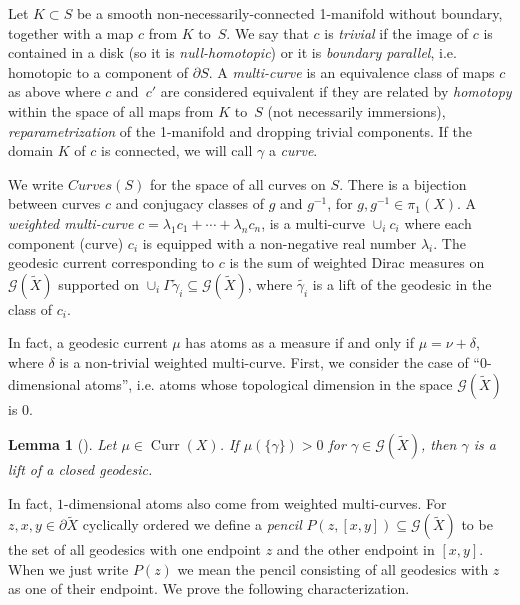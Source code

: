 \documentclass[12pt,article]{amsart}
\numberwithin{equation}{section}
\numberwithin{figure}{section}
\newtheorem{lemma}[equation]{Lemma}
\theoremstyle{definition}
\theoremstyle{plain}
\newcommand\G{\ensuremath{\mathcal{G}}}
\DeclareMathOperator{\Curr}{Curr}
\newcommand*{\wt}[1]{\widetilde{#1}}
\newcommand{\Curves}{\mathit{Curves}}
\begin{document}
Let $K \subset S$ be a smooth non-necessarily-connected
1-manifold without boundary, together with a map $c$ from $K$
to~$S$.
We say that $c$ is \emph{trivial} if the image of $c$ is contained in a disk (so it is \emph{null-homotopic}) or it is \emph{boundary parallel}, i.e. homotopic to a component of $\partial S$.
A \emph{multi-curve} is an equivalence class of maps $c$ as above where $c$ and~$c'$ are considered equivalent if they are related by 
\emph{homotopy} within the space of all maps from $K$ to~$S$ (not necessarily immersions), \emph{reparametrization} of the 1-manifold and
dropping trivial components.
If the domain $K$ of $c$ is connected, we will call $\gamma$ a \emph{curve}.


We write $\Curves(S)$ for the space of all curves on $S$.
There is a bijection between curves $c$ and conjugacy classes of $g$ and $g^{-1}$, for $g, g^{-1} \in \pi_1(X)$.
A \emph{weighted multi-curve} $c = \lambda_1 c_1 + \cdots + \lambda_n c_n$, is a multi-curve $\cup_{i} c_i$ where each component (curve) $c_i$ is equipped with a non-negative real number $\lambda_i$. The geodesic current corresponding to $c$ is the sum of weighted Dirac measures on $\mathcal{G}(\wt{X})$ supported on $\cup_i \Gamma \tilde{\gamma}_i \subseteq \mathcal{G}(\wt{X})$, where $\tilde{\gamma_i}$ is a lift of the geodesic in the class of $c_i$.



In fact, a geodesic current $\mu$ has atoms as a measure if and only if $\mu = \nu + \delta$, where $\delta$ is a non-trivial weighted multi-curve.
First, we consider the case of ``$0$-dimensional atoms'', i.e. atoms whose topological dimension in the space $\mathcal{G}(\wt{X})$ is $0$.

 \begin{lemma}[{\cite[Proposition~8.2.7]{Martelli16:IntroGeoTop}}]
 \label{martelli_discrete}
 Let $\mu \in \Curr(X)$.
 If $\mu(\{ \gamma \}) >0$ for $\gamma \in \G(\wt{X})$, then $\gamma$ is a lift of a closed geodesic.
\label{lem:discreteatoms}
\end{lemma}

In fact, $1$-dimensional atoms also come from weighted multi-curves. For $z,x,y \in \partial \wt{X}$ cyclically ordered we define a \emph{pencil} $P(z, [x,y]) \subseteq \mathcal{G}(\wt{X})$ to be the set of all geodesics with one endpoint $z$ and the other endpoint in $[x,y]$. When we just write $P(z)$ we mean the pencil consisting of all geodesics with $z$ as one of their endpoint.
We prove the following characterization.
\end{document}
